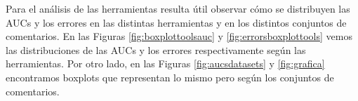 \newpage
\begin{table} [H]
\caption{Número de comentarios positivos, negativos y neutros predichos por cada herramienta}
\label{table:numpos}
\end{table}

Para el análisis de las herramientas resulta útil observar cómo se distribuyen las AUCs y los errores en las distintas herramientas y en los distintos conjuntos de comentarios. En las Figuras \ref{fig:boxplottoolsauc} y \ref{fig:errorsboxplottools} vemos las distribuciones de las AUCs y los errores respectivamente según las herramientas. Por otro lado, en las Figuras \ref{fig:aucsdatasets} y \ref{fig:grafica} encontramos boxplots que representan lo mismo pero según los conjuntos de comentarios.

